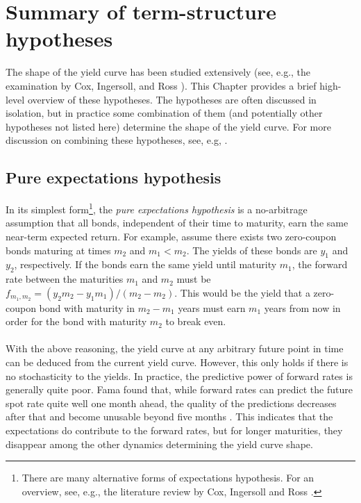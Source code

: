 \documentclass[a4paper]{artikel3}
\numberwithin{equation}{section}
\numberwithin{theorem}{section}
\numberwithin{proposition}{section}
\numberwithin{lemma}{section}
\begin{document}
\section{Summary of term-structure hypotheses}
\label{sec:hypotheses}


The shape of the yield curve has been studied extensively (see, e.g., the examination by Cox, Ingersoll, and Ross \cite{cox_ingersoll_ross_1981}). This Chapter provides a brief high-level overview of these hypotheses. The hypotheses are often discussed in isolation, but in practice some combination of them (and potentially other hypotheses not listed here) determine the shape of the yield curve. For more discussion on combining these hypotheses, see, e.g, \cite{ilmanen_iwanowski_1997}.


\subsection{Pure expectations hypothesis}
\label{sec:expectations}


In its simplest form\footnote{There are many alternative forms of expectations hypothesis. For an overview, see, e.g., the literature review by Cox, Ingersoll and Ross \cite{cox_ingersoll_ross_1981}.}, the \emph{pure expectations hypothesis} is a no-arbitrage assumption that all bonds, independent of their time to maturity, earn the same near-term expected return. For example, assume there exists two zero-coupon bonds maturing at times $m_2$ and $m_1 < m_2$. The yields of these bonds are $y_1$ and $y_2$, respectively. If the bonds earn the same yield until maturity $m_1$, the forward rate between the maturities $m_1$ and $m_2$ must be $f_{m_1, m_2} = (y_2 m_2 - y_1 m_1) / (m_2 - m_2)$. This would be the yield that a zero-coupon bond with maturity in $m_2 - m_1$ years must earn $m_1$ years from now in order for the bond with maturity $m_2$ to break even. \\
\\
With the above reasoning, the yield curve at any arbitrary future point in time can be deduced from the current yield curve. However, this only holds if there is no stochasticity to the yields. In practice, the predictive power of forward rates is generally quite poor. Fama found that, while forward rates can predict the future spot rate quite well one month ahead, the quality of the predictions decreases after that and become unusable beyond five months \cite{fama_1984a}. This indicates that the expectations do contribute to the forward rates, but for longer maturities, they disappear among the other dynamics determining the yield curve shape.
\end{document}
